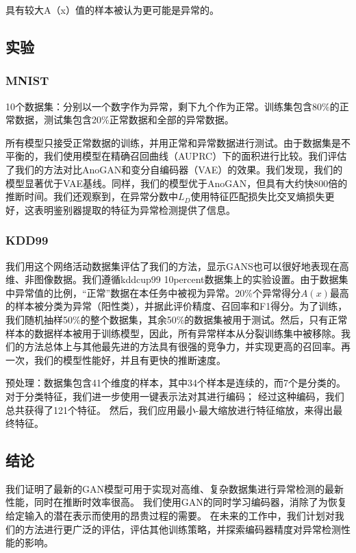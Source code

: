 \documentclass[12pt]{article}
\begin{document}
具有较大A（x）值的样本被认为更可能是异常的。

\subsection{\textbf{实验}\label{header-n37}}

\subsubsection{MNIST}\label{header-n38}

10个数据集：分别以一个数字作为异常，剩下九个作为正常。训练集包含80\%的正常数据，测试集包含20\%正常数据和全部的异常数据。

所有模型只接受正常数据的训练，并用正常和异常数据进行测试。由于数据集是不平衡的，我们使用模型在精确召回曲线（AUPRC）下的面积进行比较。我们评估了我们的方法对比AnoGAN和变分自编码器（VAE）的效果。我们发现，我们的模型显著优于VAE基线。同样，我们的模型优于AnoGAN，但具有大约快800倍的推断时间。我们还观察到，在异常分数中\(L_D\)使用特征匹配损失比交叉熵损失更好，这表明鉴别器提取的特征为异常检测提供了信息。

\subsubsection{KDD99}\label{header-n41}

我们用这个网络活动数据集评估了我们的方法，显示GANS也可以很好地表现在高维、非图像数据。我们遵循kddcup99
10percent数据集上的实验设置。由于数据集中异常值的比例，``正常''数据在本任务中被视为异常。20\%个异常得分\(A(x)\)最高的样本被分类为异常（阳性类），并据此评价精度、召回率和F1得分。为了训练，我们随机抽样50\%的整个数据集，其余50\%的数据集被用于测试。然后，只有正常样本的数据样本被用于训练模型，因此，所有异常样本从分裂训练集中被移除。我们的方法总体上与其他最先进的方法具有很强的竞争力，并实现更高的召回率。再一次，我们的模型性能好，并且有更快的推断速度。

预处理：数据集包含41个维度的样本，其中34个样本是连续的，而7个是分类的。
对于分类特征，我们进一步使用一键表示法对其进行编码；
经过这种编码，我们总共获得了121个特征。
然后，我们应用最小-最大缩放进行特征缩放，来得出最终特征。

\subsection{\textbf{结论}\label{header-n45}}

我们证明了最新的GAN模型可用于实现对高维、复杂数据集进行异常检测的最新性能，同时在推断时效率很高。
我们使用GAN的同时学习编码器，消除了为恢复给定输入的潜在表示而使用的昂贵过程的需要。
在未来的工作中，我们计划对我们的方法进行更广泛的评估，评估其他训练策略，并探索编码器精度对异常检测性能的影响。
\end{document}
